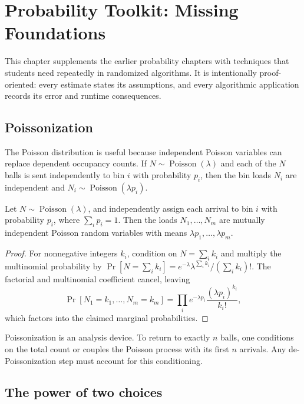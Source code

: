 \chapter{Probability Toolkit: Missing Foundations}
\label{ch:stage2-probability-toolkit}

This chapter supplements the earlier probability chapters with techniques
that students need repeatedly in randomized algorithms.  It is intentionally
proof-oriented: every estimate states its assumptions, and every algorithmic
application records its error and runtime consequences.

\section{Poissonization}

The Poisson distribution is useful because independent Poisson variables can
replace dependent occupancy counts.  If $N\sim\operatorname{Poisson}(\lambda)$
and each of the $N$ balls is sent independently to bin $i$ with probability
$p_i$, then the bin loads $N_i$ are independent and
$N_i\sim\operatorname{Poisson}(\lambda p_i)$.

\begin{theorem}
Let $N\sim\operatorname{Poisson}(\lambda)$, and independently assign each
arrival to bin $i$ with probability $p_i$, where $\sum_i p_i=1$.  Then the
loads $N_1,\ldots,N_m$ are mutually independent Poisson random variables
with means $\lambda p_1,\ldots,\lambda p_m$.
\end{theorem}

\begin{proof}
For nonnegative integers $k_i$, condition on $N=\sum_i k_i$ and multiply the
multinomial probability by
$\Pr[N=\sum_i k_i]=e^{-\lambda}\lambda^{\sum_i k_i}/(\sum_i k_i)!$.
The factorial and multinomial coefficient cancel, leaving
\[
 \Pr[N_1=k_1,\ldots,N_m=k_m]
 =\prod_i e^{-\lambda p_i}\frac{(\lambda p_i)^{k_i}}{k_i!},
\]
which factors into the claimed marginal probabilities.
\end{proof}

Poissonization is an analysis device.  To return to exactly $n$ balls, one
conditions on the total count or couples the Poisson process with its first
$n$ arrivals.  Any de-Poissonization step must account for this conditioning.

\section{The power of two choices}

